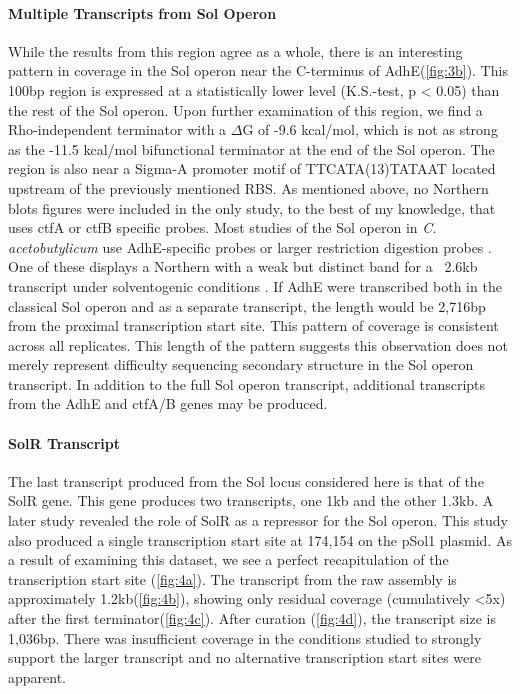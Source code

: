 \paragraph{Multiple Transcripts from Sol Operon}
While the results from this region agree as a whole, there is an interesting pattern in coverage in the Sol operon near the C-terminus of AdhE(\ref{fig:3b}). This 100bp region is expressed at a statistically lower level (K.S.-test, p < 0.05) than the rest of the Sol operon. Upon further examination of this region, we find a Rho-independent terminator with a \(\Delta\)G of -9.6 kcal/mol, which is not as strong as the -11.5 kcal/mol bifunctional terminator at the end of the Sol operon. The region is also near a Sigma-A promoter motif of TTCATA(13)TATAAT located upstream of the previously mentioned RBS. As mentioned above, no Northern blots figures were included in the only study, to the best of my knowledge, that uses ctfA or ctfB specific probes\cite{65}. Most studies of the Sol operon in \textit{C. acetobutylicum} use AdhE-specific probes or larger restriction digestion probes \cite{63,68,71}. One of these displays a Northern with a weak but distinct band for a ~2.6kb transcript under solventogenic conditions \cite{69}. If AdhE were transcribed both in the classical Sol operon and as a separate transcript, the length would be 2,716bp from the proximal transcription start site. This pattern of coverage is consistent across all replicates. This length of the pattern suggests this observation does not merely represent difficulty sequencing secondary structure in the Sol operon transcript. In addition to the full Sol operon transcript, additional transcripts from the AdhE and ctfA/B genes may be produced.


\paragraph{SolR Transcript}
The last transcript produced from the Sol locus considered here is that of the SolR gene. This gene produces two transcripts, one 1kb and the other 1.3kb\cite{63}. A later study revealed the role of SolR as a repressor for the Sol operon\cite{69}. This study also produced a single transcription start site at 174,154 on the pSol1 plasmid. As a result of examining this dataset, we see a perfect recapitulation of the transcription start site (\ref{fig:4a}). The transcript from the raw assembly is approximately 1.2kb(\ref{fig:4b}), showing only residual coverage (cumulatively \textless 5x) after the first terminator(\ref{fig:4c}). After curation (\ref{fig:4d}), the transcript size is 1,036bp. There was insufficient coverage in the conditions studied to strongly support the larger transcript and no alternative transcription start sites were apparent.


